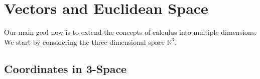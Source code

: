 \documentclass[10pt,]{book}
\theoremstyle{ptxplainnotitle}
\theoremstyle{ptxplaintitle}
\theoremstyle{ptxplainnotitle}
\theoremstyle{ptxplaintitle}
\theoremstyle{ptxplainnotitle}
\theoremstyle{ptxplaintitle}
\theoremstyle{ptxdefinitionnotitle}
\theoremstyle{ptxdefinitiontitle}
\theoremstyle{ptxdefinitionnotitle}
\theoremstyle{ptxdefinitiontitle}
\theoremstyle{ptxdefinitionnotitle}
\theoremstyle{ptxdefinitiontitle}
\theoremstyle{ptxdefinitionnotitle}
\theoremstyle{ptxdefinitiontitle}
\theoremstyle{ptxdefinitionnotitle}
\theoremstyle{ptxdefinitiontitle}
\numberwithin{equation}{section}
\newcommand{\RR}{\mathbb{R}}
\begin{document}
\chapter[{Vectors and Euclidean Space}]{Vectors and Euclidean Space}\label{vectors-space-geometry}
\hypertarget{p-718}{}%
Our main goal now is to extend the concepts of calculus into multiple dimensions. We start by considering the three-dimensional space \(\RR^{3}\).%
\typeout{************************************************}
\typeout{************************************************}
\section[{Coordinates in 3-Space}]{Coordinates in 3-Space}\label{section-coordinates-in-3-space}
\typeout{************************************************}
\typeout{************************************************}
\end{document}

